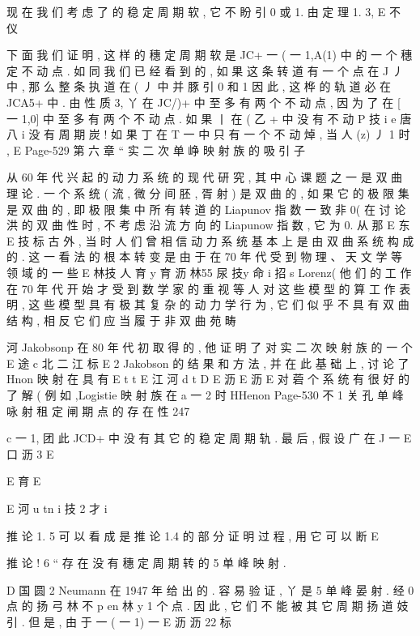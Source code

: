 {{现 在 我 们 考 虑 了 的 稳 定 周 期 软 , 它 不 盼 引 0 或 1. 由 定 理 1. 3,
E 不 仪

下 面 我 们 证 明 , 这 样 的 穗 定 周 期 软 是 JC+ 一 ( 一 1,A(1) 中
的 一 个 穗 定 不 动 点 . 如 同 我 们 已 经 看 到 的 , 如 果 这 条 转 道 有 一 个 点
在 J 丿 中 , 那 么 整 条 执 道 在 ( 丿 中 并 豚 引 0 和 1 因 此 , 这 桦 的 轨
道 必 在 JCA5+ 中 . 由 性 质 3, 丫 在 JC/)+ 中 至 多 有 两 个 不 动 点 , 因 为
了 在 [ 一 1,0] 中 至 多 有 两 个 不 动 点 . 如 果 丨 在 ( 乙 + 中 没 有 不 动
P 技 i e 唐 八 i
没 有 周 期 炭 ! 如 果 丁 在 T 一 中 只 有 一 个 不 动 焯 , 当 人 (z) 丿 1 时 ,
E
Page-529
第 六 章 “ 实 二 次 单 峥 映 射 族 的 吸 引 子

从 60 年 代 兴 起 的 动 力 系 统 的 现 代 研 究 , 其 中 心 课 题 之 一 是 双
曲 理 论 . 一 个 系 统 ( 流 , 微 分 间 胚 , 胥 射 ) 是 双 曲 的 , 如 果 它 的 极 限
集 是 双 曲 的 , 即 极 限 集 中 所 有 转 道 的 Liapunov 指 数 一 致 非 0( 在 讨
论 洪 的 双 曲 性 时 , 不 考 虑 沿 流 方 向 的 Liapunow 指 数 , 它 为 0. 从 那
E 东
E 技 标
古 外 , 当 时 人 们 曾 相 信 动 力 系 统 基 本 上 是 由 双 曲 系 统 构 成 的 . 这 一
看 法 的 根 本 转 变 是 由 于 在 70 年 代 受 到 物 理 、 天 文 学 等 领 域 的 一 些
E 林技 人 育 y 育 沥 林55 尿 技y 命 i 招 s
Lorenz( 他 们 的 工 作 在 70 年 代 开 始 才 受 到 数 学 家 的 重 视 等 人 对
这 些 模 型 的 算 工 作 表 明 , 这 些 模 型 具 有 极 其 复 杂 的 动 力 学
行 为 , 它 们 似 乎 不 具 有 双 曲 结 构 , 相 反 它 们 应 当 履 于 非 双 曲 苑 畴

河
Jakobsonp 在 80 年 代 初 取 得 的 , 他 证 明 了 对 实 二 次 映 射 族 的 一 个
E 途 c 北 二 江 标
E
2
Jakobson 的 结 果 和 方 法 , 并 在 此 基 础 上 , 讨 论 了 Hnon 映 射 在 具 有
E t t
E 江 河 d t
D
E 沥
E 沥 E
对 菪 个 系 统 有 很 好 的 了 解 ( 例 如 ,Logistie 映 射 族 在 a 一 2 时 HHenon
Page-530
不 1 关 孔 单 峰 咏 射 租 定 闸 期 点 的 存 在 性 247

c
一 1, 团 此 JCD+ 中 没 有 其 它 的 稳 定 周 期 轨 . 最 后 , 假 设 广 在 J 一
E 口 沥 3
E

E 育
E

E 河 u tn i 技 2 才
i

推 论 1. 5 可 以 看 成 是 推 论 1.4 的 部 分 证 明 过 程 , 用 它 可 以 断
E

推 论 ! 6 “ 存 在 没 有 穗 定 周 期 转 的 5 单 峰 映 射 .

D 国 圆 2
Neumann 在 1947 年 给 出 的 . 容 易 验 证 , 丫 是 5 单 峰 晏 射 . 经 0 点 的
扬
弓 林 不 p en 林 y 1
个 点 . 因 此 , 它 们 不 能 被 其 它 周 期 扬 道 妓 引 . 但 是 , 由 于 一 ( 一 1) 一
E 沥 沥 22 标

}}
